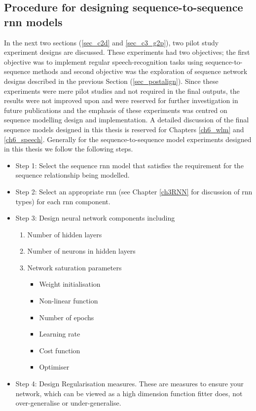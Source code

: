\subsection{Procedure for designing sequence-to-sequence \acrshort{rnn} models}\label{sec_341_rnnproc}
In the next two sections (\ref{sec_c2d} and \ref{sec_c3_g2p}), two pilot study experiment designs are discussed.  These experiments had two objectives; the first objective was to implement regular speech-recognition tasks using sequence-to-sequence methods and second objective was the exploration of sequence network designs described in the previous Section (\ref{sec_postalign}).  Since these experiments were mere pilot studies and not required in the final outputs, the results were not improved upon and were reserved for further investigation in future publications and the emphasis of these experiments was centred on sequence modelling design and implementation.  A detailed discussion of the final sequence models designed in this thesis is reserved for Chapters \ref{ch6_wlm} and \ref{ch6_speech}.  Generally for the sequence-to-sequence model experiments designed in this thesis we follow the following steps.
\begin{itemize}
    \item Step 1: Select the sequence \acrshort{rnn} model that satisfies the requirement for the sequence relationship being modelled.
    \item Step 2: Select an appropriate \acrshort{rnn} (see Chapter \ref{ch3RNN} for discussion of \acrshort{rnn} types) for each \acrshort{rnn} component.
    \item Step 3: Design neural network components including
    \begin{enumerate}
        \item Number of hidden layers
        \item Number of neurons in hidden layers
        \item Network saturation parameters
        \begin{itemize}
            \item Weight initialisation
            \item Non-linear function
            \item Number of epochs
            \item Learning rate
            \item Cost function
            \item Optimiser
        \end{itemize}
    \end{enumerate}
    \item Step 4: Design Regularisation measures.  These are measures to ensure your network, which can be viewed as a high dimension function fitter does, not over-generalise or under-generalise.
\end{itemize}


